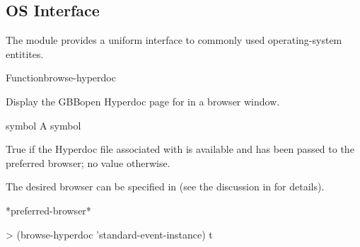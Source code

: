 \documentclass[10pt,twoside,english,pdftex]{article}
\begin{document}

\T\markright{}%
\T\pagestyle{plain}
\T\clearpage
\W{}
\T\pagestyle{fancy}
\T\thispagestyle{fancybottom}
\T\global\def\fnlastname{ }%
\subsection{OS Interface}
\label{sec:os-interface}%

%
%
The  module provides a uniform interface to
commonly used operating-system entitites. 

\W\entities
\T\clearpage


\begin{functiondoc}{Function}{browse-hyperdoc}{
  \returns{} } 
%
%
%

\fnsyntax

\fnpurpose Display the GBBopen Hyperdoc page for  in a
browser window.

\fnpackage {}

\fnmodule {}

\fnargs
\begin{args}{symbol}
\arg[symbol] A symbol
\end{args}

\fnreturns True if the Hyperdoc file associated with  is
available and has been passed to the preferred browser; no value otherwise.

%
\fndescription The desired browser can be specified in
 (see the discussion in  for details).

\begin{alsos}{*preferred-browser*}
\end{alsos}

\fnexample
\begin{example}
> (browse-hyperdoc 'standard-event-instance)
t
\end{example}

\end{functiondoc}
\end{document}

